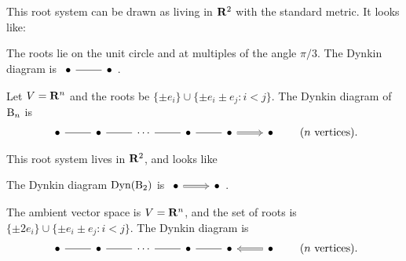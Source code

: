 \begin{example}
This root system can be drawn as living in $\mathbf{R}^2$ with the standard metric. It 
looks like:
\begin{center}
\end{center}
The roots lie on the unit circle and at multiples of the angle $\pi/3$. 
The Dynkin diagram is 
$\begin{tikzcd} \bullet \ar[r, dash] & \bullet \end{tikzcd}$. 
\end{example}

\begin{example}
Let $V=\mathbf{R}^n$ and the roots be $\{\pm e_i\}\cup \{\pm e_i\pm e_j:i<j\}$. The 
Dynkin diagram of $\mathrm{B}_n$ is 
\[
\begin{tikzcd}
  \bullet \ar[r, dash] 
    & \bullet \ar[r, dash] 
    & \cdots \ar[r, dash] 
    & \bullet \ar[r, dash] 
    & \bullet \ar[r, Rightarrow] 
    & \bullet 
\end{tikzcd}
\qquad\text{($n$ vertices)} .
\]
\end{example}

\begin{example}
This root system lives in $\mathbf{R}^2$, and looks like 
\begin{center}
\end{center}
The Dynkin diagram $\operatorname{Dyn}(\mathrm{B}_2)$ is 
$\begin{tikzcd}\bullet \ar[r, Rightarrow] & \bullet \end{tikzcd}$. 
\end{example}

\begin{example}\label{eg:typeC}
The ambient vector space is $V=\mathbf{R}^n$, and the set of roots is 
$\{\pm 2e_i\}\cup \{\pm e_i\pm e_j:i<j\}$. The Dynkin diagram is 
\[
\begin{tikzcd}
  \bullet \ar[r, dash] 
    & \bullet \ar[r, dash] 
    & \cdots \ar[r, dash] 
    & \bullet \ar[r, dash] 
    & \bullet \ar[r, Leftarrow] 
    & \bullet 
\end{tikzcd}
\qquad\text{($n$ vertices)} .
\]
\end{example}

